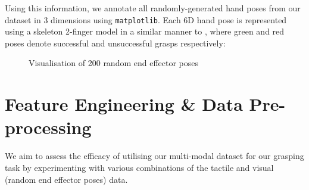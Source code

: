 \documentclass[11pt, a4paper]{report}
\begin{document}
\noindent Using this information, we annotate all randomly-generated hand poses from our dataset in 3 dimensions using \verb|matplotlib|. Each 6D hand pose is represented using a skeleton 2-finger model in a similar manner to \cite{Bekiroglu2012LearningTA}, where green and red poses denote successful and unsuccessful grasps respectively:
\begin{figure}[H]%
    \centering
    \qquad
    \qquad
    \caption{Visualisation of 200 random end effector poses}%
    \label{fig:4.6}%
\end{figure}


\newpage
\section{Feature Engineering \& Data Pre-processing}\label{sec:4.4}
We aim to assess the efficacy of utilising our multi-modal dataset for our grasping task by experimenting with various combinations of the tactile and visual (random end effector poses) data.
\end{document}
